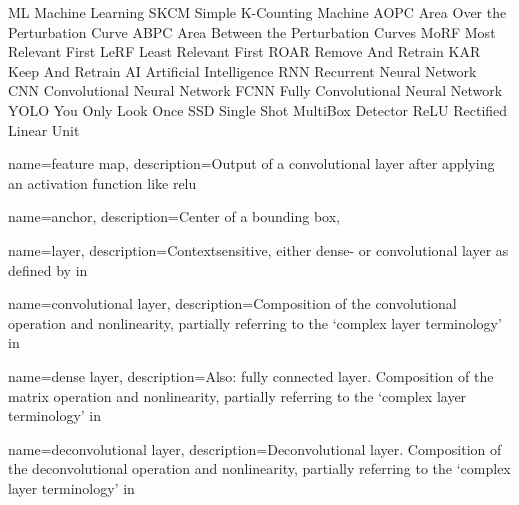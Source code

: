 
 {ML} {Machine Learning}
 {SKCM} {Simple K-Counting Machine}
 {AOPC} {Area Over the Perturbation Curve}
 {ABPC} {Area Between the Perturbation Curves}
 {MoRF} {Most Relevant First}
 {LeRF} {Least Relevant First}
 {ROAR} {Remove And Retrain}
 {KAR} {Keep And Retrain}
 {AI} {Artificial Intelligence}
 {RNN} {Recurrent Neural Network}
 {CNN} {Convolutional Neural Network}
 {FCNN} {Fully Convolutional Neural Network}
 {YOLO} {You Only Look Once}
 {SSD} {Single Shot MultiBox Detector}
 {ReLU} {Rectified Linear Unit}



 {
    name={feature map},
    description={Output of a convolutional layer after applying an activation function like \gls{relu}}
}

 {
    name={anchor},
    description={Center of a bounding box},
}

 {
    name={layer},
    description={Contextsensitive, either dense- or \gls{convolutional layer} 
    as defined by in}}

 {
    name={convolutional layer},
    description={Composition of the convolutional operation and nonlinearity, 
    partially referring to the `complex layer terminology' 
    in~\cite[341]{IanGoodfellow.2016}}
}

 {
    name={dense layer},
    description={Also: fully connected layer. Composition of the matrix operation and nonlinearity, partially referring to the `complex layer terminology' 
    in~\cite[341]{IanGoodfellow.2016}} 
}

 {
    name={deconvolutional layer},
    description={Deconvolutional layer. Composition of the deconvolutional 
    operation and nonlinearity, partially referring to the `complex layer 
    terminology' 
    in~\cite[341]{IanGoodfellow.2016}} 
}
